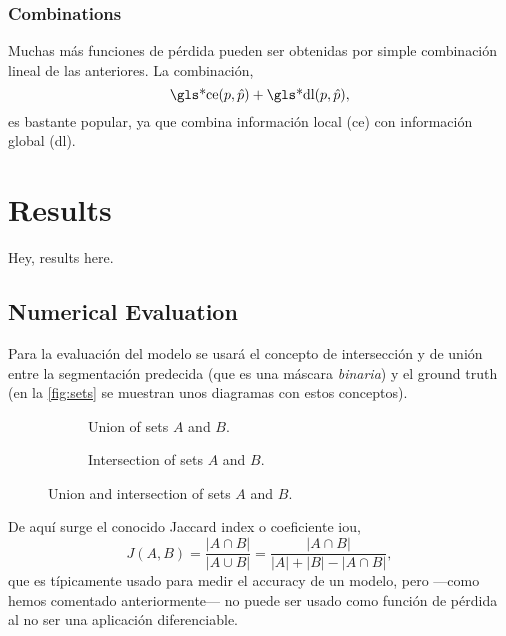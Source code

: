 \subsubsection{Combinations}
Muchas más funciones de pérdida pueden ser obtenidas por simple combinación
lineal de las anteriores. La combinación,
\begin{equation}
  \text{\gls*{ce}}(p, \hat{p}) + \text{\gls*{dl}}(p, \hat{p}),
\end{equation}
es bastante popular, ya que combina información local (\gls{ce}) con
información global (\gls{dl}).


\section{Results}
Hey, results here.

\subsection{Numerical Evaluation} \label{sec:evaluation}

Para la evaluación del modelo se usará el concepto de intersección y de unión
entre la segmentación predecida (que es una máscara \emph{binaria}) y el ground
truth (en la \vref{fig:sets} se muestran unos diagramas con estos
conceptos).

\begin{figure}[ht]
  \begin{subfigure}[b]{.5\textwidth}
    \centering
    
    \caption{Union of sets \(A\) and \(B\).}
  \end{subfigure}
  \begin{subfigure}[b]{.5\textwidth}
    \centering
    
    \caption{Intersection of sets \(A\) and \(B\).}
  \end{subfigure}
  \caption[Union and intersection of sets \(A\) and \(B\)]{Union and
    intersection of sets \(A\) and \(B\).}
  \label{fig:sets}
\end{figure}

De aquí surge el conocido Jaccard index o coeficiente \gls{iou},
\begin{equation}
  J(A,B) = \frac{|A \cap B|}{|A \cup B|}
  = \frac{|A \cap B|}{|A| + |B| - |A \cap B|},
\end{equation}
que es típicamente usado para medir el accuracy de un modelo, pero ---como
hemos comentado anteriormente--- no puede ser usado como función de pérdida al
no ser una aplicación diferenciable.

